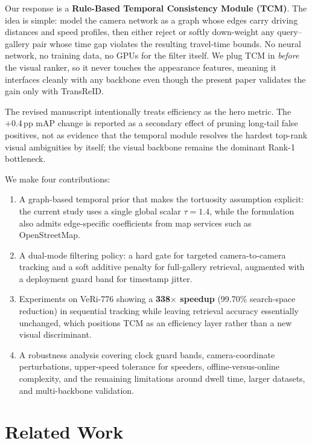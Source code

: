 \documentclass{ijitcs}
\newcommand{\rev}[1]{#1}
\begin{document}
Our response is a \textbf{Rule-Based Temporal Consistency Module (TCM)}. The idea is simple: model the camera network as a graph whose edges carry driving distances and speed profiles, then \rev{either reject or softly down-weight} any query--gallery pair whose time gap violates the resulting travel-time bounds. No neural network, no training data, no GPUs for the filter itself. We plug TCM in \textit{before} the visual ranker, so it never touches the appearance features, meaning it \rev{interfaces cleanly with any backbone even though the present paper validates the gain only with TransReID}.

\rev{The revised manuscript intentionally treats efficiency as the hero metric. The +0.4\,pp mAP change is reported as a secondary effect of pruning long-tail false positives, not as evidence that the temporal module resolves the hardest top-rank visual ambiguities by itself; the visual backbone remains the dominant Rank-1 bottleneck.}

We make four contributions:
\begin{enumerate}
    \item \rev{A graph-based temporal prior that makes the tortuosity assumption explicit: the current study uses a single global scalar $\tau = 1.4$, while the formulation also admits edge-specific coefficients from map services such as OpenStreetMap.}
    \item \rev{A dual-mode filtering policy: a hard gate for targeted camera-to-camera tracking and a soft additive penalty for full-gallery retrieval, augmented with a deployment guard band for timestamp jitter.}
    \item \rev{Experiments on VeRi-776 showing a \textbf{338$\times$ speedup} (99.70\% search-space reduction) in sequential tracking while leaving retrieval accuracy essentially unchanged, which positions TCM as an efficiency layer rather than a new visual discriminant.}
    \item \rev{A robustness analysis covering clock guard bands, camera-coordinate perturbations, upper-speed tolerance for speeders, offline-versus-online complexity, and the remaining limitations around dwell time, larger datasets, and multi-backbone validation.}
\end{enumerate}


\loadmaingeometry

\section{Related Work}
\end{document}
